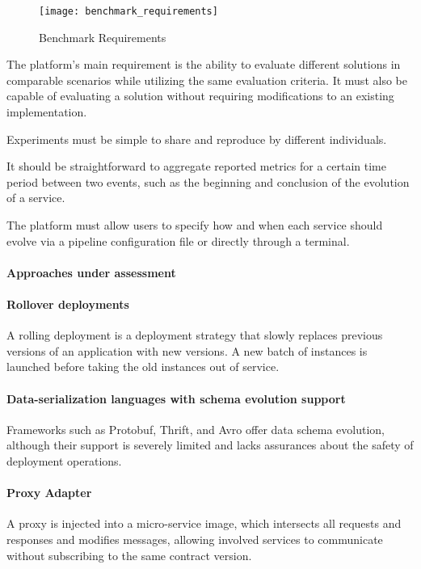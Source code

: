 \begin{figure}[htbp]
    \centering
    \texttt{[image: benchmark\_requirements]}
    \caption{Benchmark Requirements}
    \label{fig:benchmark}
\end{figure}

The platform's main requirement is the ability to evaluate different solutions in comparable scenarios while utilizing the same evaluation criteria. It must also be capable of evaluating a solution without requiring modifications to an existing implementation.

Experiments must be simple to share and reproduce by different individuals.

It should be straightforward to aggregate reported metrics for a certain time period between two events, such as the beginning and conclusion of the evolution of a service.

The platform must allow users to specify how and when each service should evolve via a pipeline configuration file or directly through a terminal.

\paragraph{Approaches under assessment}

\paragraph{Rollover deployments}
A rolling deployment is a deployment strategy that slowly replaces previous versions of an application with new versions.
A new batch of instances is launched before taking the old instances out of service.

\paragraph{Data-serialization languages with schema evolution support }
Frameworks such as Protobuf, Thrift, and Avro offer data schema evolution, although their support is severely limited and lacks assurances about the safety of deployment operations.

\paragraph{Proxy Adapter}
A proxy is injected into a micro-service image, which intersects all requests and responses and modifies messages, allowing involved services to communicate without subscribing to the same contract version.

